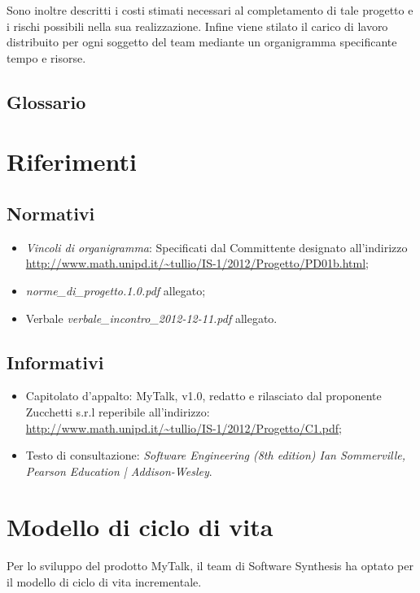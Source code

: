 Sono inoltre descritti i costi stimati necessari al completamento di tale progetto e i rischi possibili nella sua realizzazione. Infine viene stilato il carico di lavoro distribuito per ogni soggetto del team mediante un organigramma specificante tempo e risorse.

\subsection{Glossario}
\glossaryIntro

\section{Riferimenti}

\subsection{Normativi}
\begin{itemize}
\item[] \textit{Vincoli di organigramma}: Specificati dal Committente designato all'indirizzo\\ \url{http://www.math.unipd.it/~tullio/IS-1/2012/Progetto/PD01b.html};
\item[] \textit{norme\_di\_progetto.1.0.pdf} allegato;
\item[] Verbale \textit{verbale\_incontro\_2012-12-11.pdf} allegato.
\end{itemize}

\subsection{Informativi}
\begin{itemize}
\item[] Capitolato d'appalto: MyTalk, v1.0, redatto e rilasciato dal proponente Zucchetti s.r.l reperibile all'indirizzo: \\ \url{http://www.math.unipd.it/~tullio/IS-1/2012/Progetto/C1.pdf};
\item[] Testo di consultazione: \textit{Software Engineering (8th edition) Ian Sommerville, Pearson Education | Addison-Wesley}.
\end{itemize}
\clearpage

\section{Modello di ciclo di vita}
Per lo sviluppo del prodotto MyTalk, il team di Software Synthesis ha optato per il modello di ciclo di vita incrementale.


